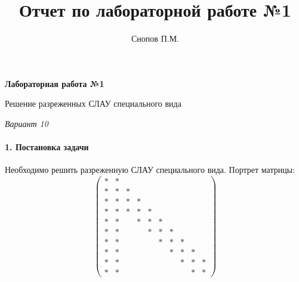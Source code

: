 \documentclass[11pt,a4paper,twoside]{report}
\begin{document}
\title{Отчет по лабораторной работе №1}

\author{Снопов П.М.}
\thispagestyle{titlepagestyle}
\maketitle
\begin{center}
	\textbf{Лабораторная работа №1}
	
	Решение разреженных СЛАУ специального вида
	
	\textit{Вариант 10}
\end{center}

\paragraph{1. Постановка задачи}
Необходимо решить разреженную СЛАУ специального вида. Портрет матрицы: 
\[
\begin{pmatrix}
	* & * &  &   &   &   &   &   &   &   \\
	* & * & * &   &   &   &   &   &   &   \\
	* & * & * & * &   &   &   &   &   &   \\
	* & * & * & * & * &   &   &   &   &   \\
	* & * &   & * & * & * &   &   &   &   \\
	* & * &   &   & * & * & * &   &   &   \\
	* & * &   &   &   & * & * & * &   &   \\
	* & * &   &   &   &   & * & * & * &   \\
	* & * &   &   &   &   &   & * & * & * \\
	* & * &   &   &   &   &   &   & * & * 
\end{pmatrix}
\]
\end{document}
